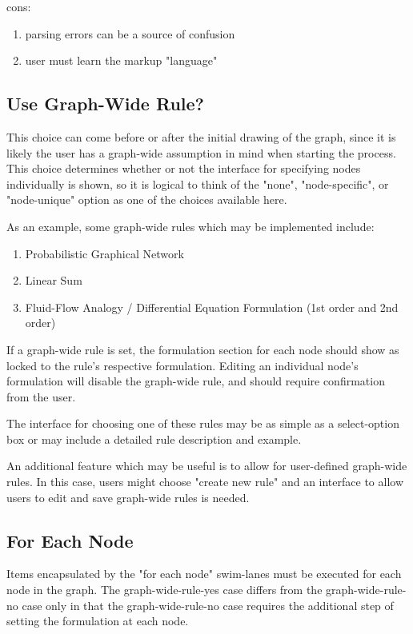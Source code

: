 cons:
\begin{enumerate}
 \item parsing errors can be a source of confusion
 \item user must learn the markup "language"
\end{enumerate}

\subsection{Use Graph-Wide Rule?}
This choice can come before or after the initial drawing of the graph, since it is likely the user has a graph-wide assumption in mind when starting the process. 
This choice determines whether or not the interface for specifying nodes individually is shown, so it is logical to think of the "none", "node-specific", or "node-unique" option as one of the choices available here. 

As an example, some graph-wide rules which may be implemented include:
\begin{enumerate}
  \item Probabilistic Graphical Network
  \item Linear Sum
  \item Fluid-Flow Analogy / Differential Equation Formulation (1st order and 2nd order)
\end{enumerate}

If a graph-wide rule is set, the formulation section for each node should show as locked to the rule's respective formulation. 
Editing an individual node's formulation will disable the graph-wide rule, and should require confirmation from the user. 

The interface for choosing one of these rules may be as simple as a select-option box or may include a detailed rule description and example. 

An additional feature which may be useful is to allow for user-defined graph-wide rules. 
In this case, users might choose "create new rule" and an interface to allow users to edit and save graph-wide rules is needed.

\subsection{For Each Node}

Items encapsulated by the "for each node" swim-lanes must be executed for each node in the graph. 
The graph-wide-rule-yes case differs from the graph-wide-rule-no case only in that the graph-wide-rule-no case requires the additional step of setting the formulation at each node.

